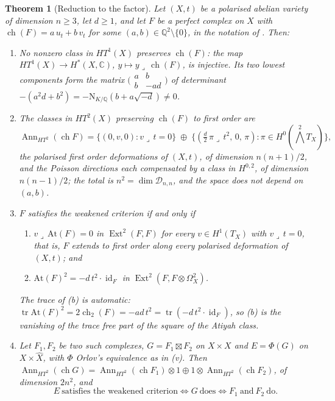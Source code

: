\documentclass[11pt,reqno]{amsart}
\theoremstyle{plain}
\newtheorem{theorem}{Theorem}[section]
\theoremstyle{definition}
\theoremstyle{remark}
\newcommand{\QQ}{\mathbb{Q}}
\newcommand{\CC}{\mathbb{C}}
\newcommand{\cD}{\mathcal{D}}
\newcommand{\Nm}{\mathrm{N}}             %
\DeclareMathOperator{\ch}{ch}
\DeclareMathOperator{\Ext}{Ext}
\DeclareMathOperator{\id}{id}
\DeclareMathOperator{\Ann}{Ann}
\begin{document}
\begin{theorem}[Reduction to the factor]\label{thm:factor}
Let $(X,t)$ be a polarised abelian variety of dimension $n\ge3$, let $d\ge1$,
and let $F$ be a perfect complex on $X$ with
$\ch(F)=a\,u_{t}+b\,v_{t}$ for some $(a,b)\in\QQ^{2}\setminus\{0\}$, in the
notation of \cite[(30)]{paperI}. Then:
\begin{enumerate}[label=\textup{(\roman*)},nosep]
\item No nonzero class in $HT^{1}(X)$ preserves $\ch(F)$: the map
  $HT^{1}(X)\to H^{*}(X,\CC)$, $y\mapsto y\lrcorner\,\ch(F)$, is injective. Its
  two lowest components form the matrix
  $\bigl(\begin{smallmatrix}a&b\\ b&-ad\end{smallmatrix}\bigr)$ of
  determinant $-(a^{2}d+b^{2})=-\Nm_{K/\QQ}(b+a\sqrt{-d})\ne0$.
\item The classes in $HT^{2}(X)$ preserving $\ch(F)$ to first order are
  \begin{equation}\label{eq:secantkernel}
    \Ann_{HT^{2}}(\ch F)
    =\bigl\{(0,v,0):v\lrcorner\,t=0\bigr\}\;\oplus\;
     \bigl\{(\tfrac d2\,\pi\lrcorner\,t^{2},\,0,\,\pi):
       \pi\in H^{0}(\textstyle\bigwedge^{2}T_{X})\bigr\},
  \end{equation}
  the polarised first order deformations of $(X,t)$, of dimension $n(n+1)/2$,
  and the Poisson directions each compensated by a class in $H^{0,2}$, of
  dimension $n(n-1)/2$; the total is $n^{2}=\dim\cD_{n,n}$, and the space
  does not depend on $(a,b)$.
\item $F$ satisfies the weakened criterion if and only if
  \begin{enumerate}[label=\textup{(\alph*)},nosep]
  \item $v\lrcorner\,\mathrm{At}(F)=0$ in $\Ext^{2}(F,F)$ for every
    $v\in H^{1}(T_{X})$ with $v\lrcorner\,t=0$, that is, $F$ extends to first
    order along every polarised deformation of $(X,t)$; and
  \item $\mathrm{At}(F)^{2}=-d\,t^{2}\cdot\id_{F}$ in
    $\Ext^{2}(F,F\otimes\Omega^{2}_{X})$.
  \end{enumerate}
  The trace of (b) is automatic: $\operatorname{tr}\mathrm{At}(F)^{2}
  =2\ch_{2}(F)=-ad\,t^{2}=\operatorname{tr}(-d\,t^{2}\cdot\id_{F})$, so (b)
  is the vanishing of the trace free part of the square of the Atiyah class.
\item Let $F_{1},F_{2}$ be two such complexes, $G=F_{1}\boxtimes F_{2}$ on
  $X\times X$ and $E=\Phi(G)$ on $X\times\widehat X$, with $\Phi$ Orlov's
  equivalence as in (v). Then
  $\Ann_{HT^{2}}(\ch G)=\Ann_{HT^{2}}(\ch F_{1})\otimes1\oplus
  1\otimes\Ann_{HT^{2}}(\ch F_{2})$, of dimension $2n^{2}$, and
  \[
    E\ \text{satisfies the weakened criterion}
    \iff G\ \text{does}
    \iff F_{1}\ \text{and}\ F_{2}\ \text{do}.
  \]
\end{enumerate}
\end{theorem}
\end{document}
